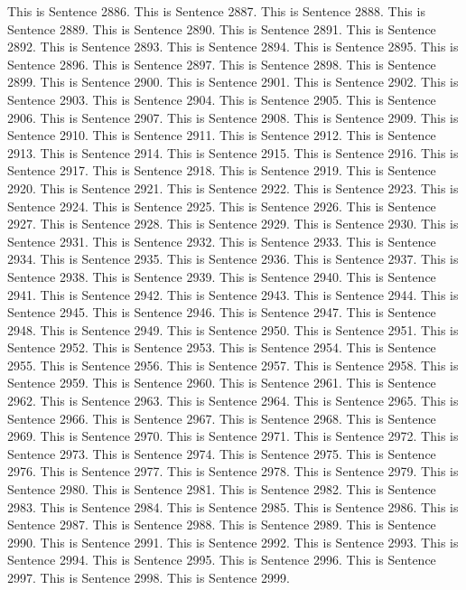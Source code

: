 \documentclass{article}
\begin{document}
This is Sentence 2886.
This is Sentence 2887.
This is Sentence 2888.
This is Sentence 2889.
This is Sentence 2890.
This is Sentence 2891.
This is Sentence 2892.
This is Sentence 2893.
This is Sentence 2894.
This is Sentence 2895.
This is Sentence 2896.
This is Sentence 2897.
This is Sentence 2898.
This is Sentence 2899.
This is Sentence 2900.
This is Sentence 2901.
This is Sentence 2902.
This is Sentence 2903.
This is Sentence 2904.
This is Sentence 2905.
This is Sentence 2906.
This is Sentence 2907.
This is Sentence 2908.
This is Sentence 2909.
This is Sentence 2910.
This is Sentence 2911.
This is Sentence 2912.
This is Sentence 2913.
This is Sentence 2914.
This is Sentence 2915.
This is Sentence 2916.
This is Sentence 2917.
This is Sentence 2918.
This is Sentence 2919.
This is Sentence 2920.
This is Sentence 2921.
This is Sentence 2922.
This is Sentence 2923.
This is Sentence 2924.
This is Sentence 2925.
This is Sentence 2926.
This is Sentence 2927.
This is Sentence 2928.
This is Sentence 2929.
This is Sentence 2930.
This is Sentence 2931.
This is Sentence 2932.
This is Sentence 2933.
This is Sentence 2934.
This is Sentence 2935.
This is Sentence 2936.
This is Sentence 2937.
This is Sentence 2938.
This is Sentence 2939.
This is Sentence 2940.
This is Sentence 2941.
This is Sentence 2942.
This is Sentence 2943.
This is Sentence 2944.
This is Sentence 2945.
This is Sentence 2946.
This is Sentence 2947.
This is Sentence 2948.
This is Sentence 2949.
This is Sentence 2950.
This is Sentence 2951.
This is Sentence 2952.
This is Sentence 2953.
This is Sentence 2954.
This is Sentence 2955.
This is Sentence 2956.
This is Sentence 2957.
This is Sentence 2958.
This is Sentence 2959.
This is Sentence 2960.
This is Sentence 2961.
This is Sentence 2962.
This is Sentence 2963.
This is Sentence 2964.
This is Sentence 2965.
This is Sentence 2966.
This is Sentence 2967.
This is Sentence 2968.
This is Sentence 2969.
This is Sentence 2970.
This is Sentence 2971.
This is Sentence 2972.
This is Sentence 2973.
This is Sentence 2974.
This is Sentence 2975.
This is Sentence 2976.
This is Sentence 2977.
This is Sentence 2978.
This is Sentence 2979.
This is Sentence 2980.
This is Sentence 2981.
This is Sentence 2982.
This is Sentence 2983.
This is Sentence 2984.
This is Sentence 2985.
This is Sentence 2986.
This is Sentence 2987.
This is Sentence 2988.
This is Sentence 2989.
This is Sentence 2990.
This is Sentence 2991.
This is Sentence 2992.
This is Sentence 2993.
This is Sentence 2994.
This is Sentence 2995.
This is Sentence 2996.
This is Sentence 2997.
This is Sentence 2998.
This is Sentence 2999.
\end{document}
